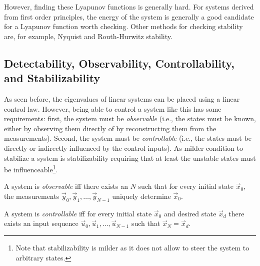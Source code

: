 				However, finding these Lyapunov functions is generally hard. For systems derived from first order principles, the energy of the system is generally a good candidate for a Lyapunov function worth checking. Other methods for checking stability are, for example, Nyquist and Routh-Hurwitz stability.

		\subsection{Detectability, Observability, Controllability, and Stabilizability}
			As seen before, the eigenvalues of linear systems can be placed using a linear control law. However, being able to control a system like this has some requirements: first, the system must be \emph{observable} (i.e., the states must be known, either by observing them directly of by reconstructing them from the measurements). Second, the system must be \emph{controllable} (i.e., the states must be directly or indirectly influenced by the control inputs). As milder condition to stabilize a system is stabilizability requiring that at least the unstable states must be influenceable\footnote{Note that stabilizability is milder as it does not allow to steer the system to arbitrary states.}.

			\begin{definition}[Observability]
				A system is \emph{observable} iff there exists an \(N\) such that for every initial state \(\vec{x}_0\), the measurements \( \vec{y}_0, \vec{y}_1, \dots, \vec{y}_{N - 1} \) uniquely determine \(\vec{x}_0\).
			\end{definition}
			\begin{definition}[Controllability]
				A system is \emph{controllable} iff for every initial state \(\vec{x}_0\) and desired state \(\vec{x}_d\) there exists an input sequence \( \vec{u}_0, \vec{u}_1, \dots, \vec{u}_{N - 1} \) such that \( \vec{x}_N = \vec{x}_d \).
			\end{definition}

